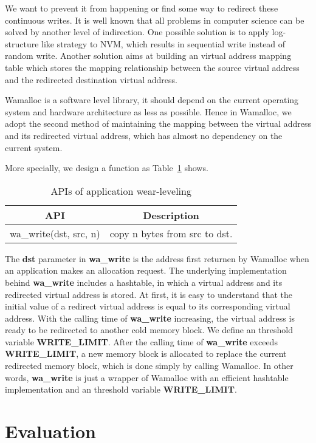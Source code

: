 \documentclass{vldb}
\begin{document}
We want to prevent it from happening or find some way to redirect these continuous writes.
It is well known that all problems in computer science can be solved by another level of indirection.
One possible solution is to apply log-structure like strategy\cite{rumble2014log} to NVM, 
which results in sequential write instead of random write.
Another solution aims at building an virtual address mapping table which stores the mapping relationship between the source virtual address and the redirected destination virtual address\cite{shao2012ptl}.

Wamalloc is a software level library, it should depend on the current operating system and hardware architecture as less as possible.
Hence in Wamalloc, we adopt the second method of maintaining the mapping between the virtual address and its redirected virtual address,
which has almost no dependency on the current system.

More specially, we design a function as Table~\ref{tab:api} shows.

\begin{table}[h]
\centering
\caption{APIs of application wear-leveling}
\begin{tabular}{|c|c|} \hline
API&Description\\ \hline
    wa\_write(dst, src, n)& copy n bytes from src to dst.\\ \hline
\end{tabular}
\label{tab:api}
\end{table}

The \textbf{dst} parameter in \textbf{wa\_write} is the address first returnen by Wamalloc when an application makes an allocation request.
The underlying implementation behind \textbf{wa\_write} includes a hashtable, in which a virtual address and its redirected virtual address is stored.
At first, it is easy to understand that the initial value of a redirect virtual address is equal to its corresponding virtual address.
With the calling time of \textbf{wa\_write} increasing, the virtual address is ready to be redirected to another cold memory block.
We define an threshold variable \textbf{WRITE\_LIMIT}.
After the calling time of \textbf{wa\_write} exceeds \textbf{WRITE\_LIMIT}, 
a new memory block is allocated to replace the current redirected memory block, which is done simply by calling Wamalloc.
In other words, \textbf{wa\_write} is just a wrapper of Wamalloc with an efficient hashtable implementation and an threshold variable \textbf{WRITE\_LIMIT}.

\section{Evaluation}
\end{document}
